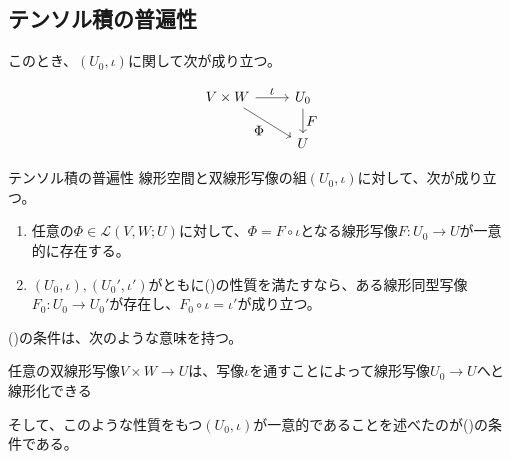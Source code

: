 \documentclass[../../../topic_linear-algebra]{subfiles}
\begin{document}
\subsection{テンソル積の普遍性}

このとき、$(U_0, \iota)$に関して次が成り立つ。

\begin{equation*}
  \begin{tikzcd}[every label/.append style = {font = \normalsize}]
    V \times W \arrow[r,"\iota"]\arrow[rd, "\Phi"'] & U_0 \arrow[d,"F"]\\
    & U
  \end{tikzcd}
\end{equation*}

\begin{theorem*}{テンソル積の普遍性}
  線形空間と双線形写像の組$(U_0, \iota)$に対して、次が成り立つ。
  \begin{enumerate}[label=\romanlabel]
    \item 任意の$\Phi \in \mathcal{L}(V, W; U)$に対して、$\Phi = F \circ \iota$となる線形写像$F\colon U_0 \to U$が一意的に存在する。
    \item $(U_0, \iota), (U_0', \iota')$がともに()の性質を満たすなら、ある線形同型写像$F_0 \colon U_0 \to U_0'$が存在し、$F_0 \circ \iota = \iota'$が成り立つ。
  \end{enumerate}
\end{theorem*}

()の条件は、次のような意味を持つ。
\begin{emphabox}
  \begin{spacebox}
    \begin{center}
      任意の双線形写像$V \times W \to U$は、写像$\iota$を通すことによって線形写像$U_0 \to U$へと線形化できる
    \end{center}
  \end{spacebox}
\end{emphabox}

そして、このような性質をもつ$(U_0, \iota)$が一意的であることを述べたのが()の条件である。
\end{document}
